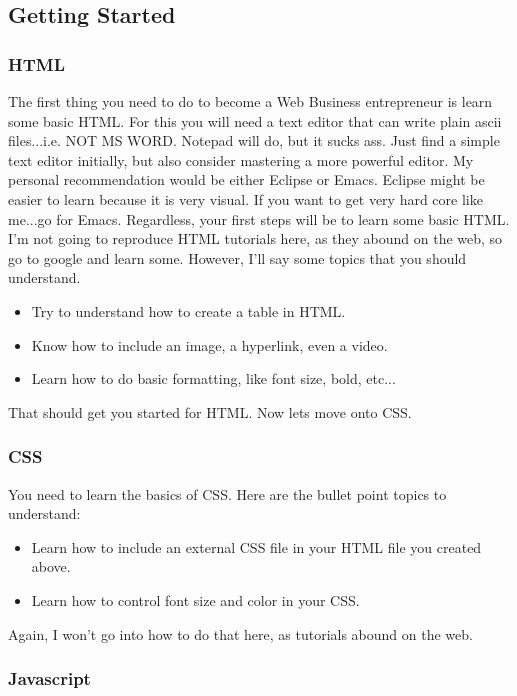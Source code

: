 \subsection{Getting Started}

\subsubsection{HTML}
The first thing you need to do to become a Web Business entrepreneur is learn some basic HTML.  For this you will need a text editor that can write plain ascii files...i.e. NOT MS WORD.  Notepad will do, but it sucks ass.  Just find a simple text editor initially, but also consider mastering a more powerful editor.  My personal recommendation would be either Eclipse or Emacs.  Eclipse might be easier to learn because it is very visual.  If you want to get very hard core like me...go for Emacs.  Regardless, your first steps will be to learn some basic HTML.  I'm not going to reproduce HTML tutorials here, as they abound on the web, so go to google and learn some.  However, I'll say some topics that you should understand.

\begin{itemize}
\item Try to understand how to create a table in HTML.
\item Know how to include an image, a hyperlink, even a video.
\item Learn how to do basic formatting, like font size, bold, etc...
\end{itemize}

That should get you started for HTML.  Now lets move onto CSS.

\subsubsection{CSS}

You need to learn the basics of CSS.  Here are the bullet point topics to understand:

\begin{itemize}
\item Learn how to include an external CSS file in your HTML file you created above.
\item Learn how to control font size and color in your CSS.
\end{itemize}

Again, I won't go into how to do that here, as tutorials abound on the web.

\subsubsection{Javascript}

